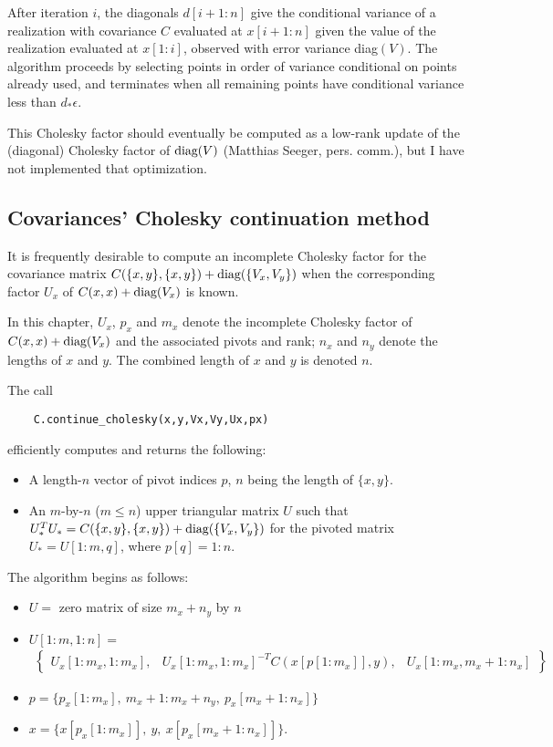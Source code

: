 \documentclass{report}
\begin{document}
\medskip
After iteration $i$, the diagonals $d[i+1:n]$ give the conditional variance of a realization with covariance $C$ evaluated at $x[i+1:n]$ given the value of the realization evaluated at $x[1:i]$, observed with error variance diag$(V)$. The algorithm proceeds by selecting points in order of variance conditional on points already used, and terminates when all remaining points have conditional variance less than $d_*\epsilon$.

This Cholesky factor should eventually be computed as a low-rank update \cite{Seeger} of the (diagonal) Cholesky factor of $\textup{diag}(V)$ (Matthias Seeger, pers. comm.), but I have not implemented that optimization.

\subsection{Covariances' Cholesky continuation method}
It is frequently desirable to compute an incomplete Cholesky factor for the covariance matrix
$C(\{x,y\},\{x,y\}) + \textup{diag}(\{V_x,V_y\})$ when the corresponding factor $U_x$ of $C(x,x) + \textup{diag}(V_x)$ is known. 

In this chapter, $U_x$, $p_x$ and $m_x$ denote the incomplete Cholesky factor of $C(x,x)+\textup{diag}(V_x)$ and the associated pivots and rank; $n_x$ and $n_y$ denote the lengths of $x$ and $y$. The combined length of $x$ and $y$ is denoted $n$.

The call
\begin{verbatim}
    C.continue_cholesky(x,y,Vx,Vy,Ux,px)
\end{verbatim}
efficiently computes and returns the following:
\begin{itemize}
    \item A length-$n$ vector of pivot indices $p$, $n$ being the length of $\{x,y\}$.
    \item An $m$-by-$n$ ($m\le n$) upper triangular matrix $U$ such that $U_*^TU_* = C(\{x,y\},\{x,y\}) + \textup{diag}(\{V_x,V_y\})$ for the pivoted matrix $U_* = U[1:m,q]$, where $p[q]=1:n$.
\end{itemize}

The algorithm begins as follows:
\begin{itemize}
    \item $U=$ zero matrix of size $m_x+n_y$ by $n$
    \item$U[1:m,1:n]=$ \begin{eqnarray*}
        \left\{\begin{array}{ccc}
            U_x[1:m_x,1:m_x],&U_x[1:m_x,1:m_x]^{-T} C(x[p[1:m_x]], y),&U_x[1:m_x,m_x+1:n_x]
        \end{array}\right\}
    \end{eqnarray*}
    \item $p=\{p_x[1:m_x],\ m_x+1:m_x+n_y,\ p_x[m_x+1:n_x]\}$
    \item $x=\{x[p_x[1:m_x]],\ y,\ x[p_x[m_x+1:n_x]]\}$.
\end{itemize}
\end{document}

